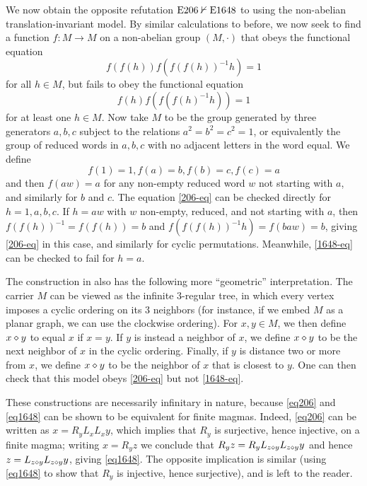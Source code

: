 \begin{example}\label{trans-nonab}  We now obtain the opposite refutation $\mathrm{E}206 \nvdash \mathrm{E}1648$ to  using the non-abelian translation-invariant model.  By similar calculations to before, we now seek to find a function $f \colon M \to M$ on a non-abelian group $(M,\cdot)$ that obeys the functional equation
\begin{equation}\label{206-eq}
 f(f(h)) f(f(f(h))^{-1} h) = 1
\end{equation}
for all $h \in M$, but fails to obey the functional equation
\begin{equation}\label{1648-eq}
   f(h) f(f(f(h)^{-1} h)) = 1
\end{equation}
for at least one $h \in M$.  Now take $M$ to be the group generated by three generators $a,b,c$ subject to the relations $a^2=b^2=c^2=1$, or equivalently the group of reduced words in $a,b,c$ with no adjacent letters in the word equal.  We define
$$ f(1) = 1, f(a)=b, f(b) = c, f(c) = a$$
and then $f(aw)=a$ for any non-empty reduced word $w$ not starting with $a$, and similarly for $b$ and $c$.  The equation \eqref{206-eq} can be checked directly for $h=1,a,b,c$.  If $h=aw$ with $w$ non-empty, reduced, and not starting with $a$, then $f(f(h))^{-1} = f(f(h)) = b$ and $f(f(f(h))^{-1} h) = f(baw) = b$, giving \eqref{206-eq} in this case, and similarly for cyclic permutations. Meanwhile, \eqref{1648-eq} can be checked to fail for $h=a$.
\end{example}

\begin{remark}  The construction in  also has the following more ``geometric'' interpretation.  The carrier $M$ can be viewed as the infinite $3$-regular tree, in which every vertex imposes a cyclic ordering on its $3$ neighbors (for instance, if we embed $M$ as a planar graph, we can use the clockwise ordering).  For $x,y \in M$, we then define $x \diamond y$ to equal $x$ if $x=y$.  If $y$ is instead a neighbor of $x$, we define $x \diamond y$ to be the next neighbor of $x$ in the cyclic ordering.  Finally, if $y$ is distance two or more from $x$, we define $x \diamond y$ to be the neighbor of $x$ that is closest to $y$.  One can then check that this model obeys \eqref{206-eq} but not \eqref{1648-eq}.
\end{remark}

\begin{remark} These constructions are necessarily infinitary in nature, because \eqref{eq206} and \eqref{eq1648} can be shown to be equivalent for finite magmas. Indeed, \eqref{eq206} can be written as $x = R_y L_x L_x y$, which implies that $R_y$ is surjective, hence injective, on a finite magma; writing $x = R_y z$ we conclude that $R_y z = R_y L_{z \diamond y} L_{z \diamond y} y$ and hence $z = L_{z \diamond y} L_{z \diamond y} y$, giving \eqref{eq1648}.  The opposite implication is similar (using \eqref{eq1648} to show that $R_y$ is injective, hence surjective), and is left to the reader.
\end{remark}

